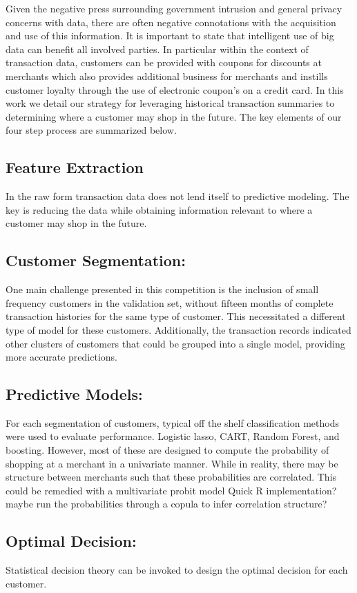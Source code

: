 \documentclass[12pt]{article} %
\begin{document}
Given the negative press surrounding government intrusion and general privacy concerns with data, there are often negative connotations with the acquisition and use of this information.  It is important to state that intelligent use of big data can benefit all involved parties.  In particular within the context of transaction data, customers can be provided with coupons for discounts at merchants  which also provides additional business for merchants and instills customer loyalty through the use of electronic coupon's on a credit card.  In this work we detail our strategy for leveraging historical transaction summaries to determining where a customer may shop in the future.  The key elements of our four step process are summarized below. 
\subsection*{Feature Extraction} 
In the raw form transaction data does not lend itself to predictive modeling.  The key is reducing the data while obtaining information relevant to where a customer may shop in the future.
\subsection*{Customer Segmentation:} 
One main challenge presented in this competition is the inclusion of small frequency customers in the validation set, without fifteen months of complete transaction histories for the same type of customer.  This necessitated a different type of model for these customers.  Additionally, the transaction records indicated other clusters of customers that could be grouped into a single model, providing more accurate predictions.
\subsection*{Predictive Models:} 
For each segmentation of customers, typical off the shelf classification methods were used to evaluate performance.  Logistic lasso, CART, Random Forest, and boosting.  However, most of these are designed to compute the probability of shopping at a merchant in a univariate manner.  While in reality, there may be structure between merchants such that these probabilities are correlated.  This could be remedied with a multivariate probit model \ac{ Quick R implementation?  maybe run the probabilities through a copula to infer correlation structure?}
\subsection*{Optimal Decision:} 
Statistical decision theory can be invoked to design the optimal decision for each customer.
\end{document}
